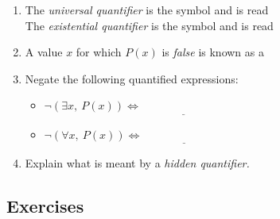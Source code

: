 \begin{enumerate}
  \item The \emph{universal quantifier} is the symbol \underline{\phantom{$\forall$}\qquad} and is read \underline{\phantom{for all}\qquad\qquad}\\
  The \emph{existential quantifier} is the symbol \underline{\phantom{$\exists$}\qquad} and is read \underline{\phantom{there exists}\qquad\qquad}
  \item A value $x$ for which $P(x)$ is \emph{false} is known as a \underline{\phantom{counterexample}\qquad\qquad}
  \item Negate the following quantified expressions:
  \begin{itemize}
    \item $\neg(\exists x,\ P(x))\iff\underline{\phantom{\forall x,\ \neg P(x)\qquad}}$
    \item $\neg(\forall x,\ P(x))\iff\underline{\phantom{\exists x,\ \neg P(x)\qquad}}$
  \end{itemize}
  \item Explain what is meant by a \emph{hidden quantifier.}
\end{enumerate}

\subsection*{Exercises}

